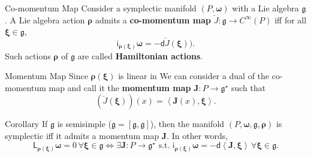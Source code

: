 \documentclass{beamer}
\begin{document}
\begin{frame}{}
  \begin{block}{Co-momentum Map}
    Consider a symplectic manifold \((P, \boldsymbol{\omega})\) with a Lie algebra \(\mathfrak{g}\). A Lie algebra action \(\boldsymbol{\rho}\) admits a \textbf{co-momentum map} \(\check{J}: \mathfrak{g} \to C ^{\infty} (P)\) iff for all \(\boldsymbol{\xi} \in \mathfrak{g}\),
    \begin{equation}
      \mathsf{i} _{\boldsymbol{\rho} (\boldsymbol{\xi})} \boldsymbol{\omega} = - \mathsf{d} \check{J} (\boldsymbol{\xi})).
    \end{equation}
    Such actions \(\boldsymbol{\rho}\) of \(\mathfrak{g}\) are called \textbf{Hamiltonian actions}.
  \end{block}

  \begin{block}{Momentum Map}
    Since \(\boldsymbol{\rho} (\boldsymbol{\xi})\) is linear in 
    We can consider a dual of the co-momentum map and call it the \textbf{momentum map} \(\boldsymbol{J}: P \to \mathfrak{g} ^{\star}\) such that
    \begin{equation}
      (\check{J} (\boldsymbol{\xi})) (x) = \left< \boldsymbol{J} (x), \boldsymbol{\xi} \right>.
    \end{equation}
  \end{block}
\end{frame}

\begin{frame}{}
  \begin{alertblock}{Corollary}
    If \(\mathfrak{g}\) is semisimple (\(\mathfrak{g} = \left[ \mathfrak{g}, \mathfrak{g} \right]\)), then the manifold \((P, \boldsymbol{\omega}, \mathfrak{g}, \boldsymbol{\rho})\) is symplectic iff it admits a momentum map \(\boldsymbol{J}\). In other words,
    \begin{equation}
      \mathsf{L}_ {\boldsymbol{\rho} (\boldsymbol{\xi})} \boldsymbol{\omega} = 0 \, \forall \boldsymbol{\xi} \in \mathfrak{g} \Leftrightarrow \exists \boldsymbol{J}: P \to \mathfrak{g} ^{\star} \text{ s.t. } \mathsf{i} _{\boldsymbol{\rho}(\boldsymbol{\xi})} \boldsymbol{\omega} = - \mathsf{d} \left< \boldsymbol{J}, \boldsymbol{\xi} \right> \, \forall \boldsymbol{\xi} \in \mathfrak{g}.
    \end{equation}
  \end{alertblock}
\end{frame}
\end{document}
